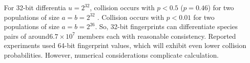 
For 32-bit differentia $u = 2^{32}$, collision occurs with $p < 0.5$ ($p = 0.46$) for two populations of size $a = b = 2^{32}$ .
Collision occurs with $p < 0.01$ for two populations of size $a = b = 2^{26}$.
So, 32-bit fingerprints can differentiate species pairs of around$ 6.7 \times 10^{7}$ members each with reasonable consistency.
Reported experiments used 64-bit fingerprint values, which will exhibit even lower collision probabilities.
However, numerical considerations complicate calculation.
